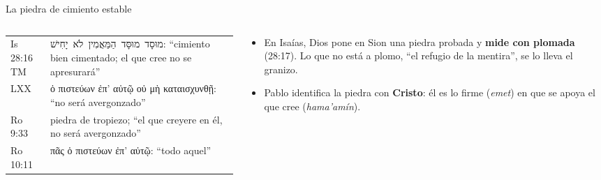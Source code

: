 \documentclass[hyperref={bookmarks=false},aspectratio=169]{beamer}
\newcommand{\heb}[1]{\mbox{\foreignlanguage{hebrew}{#1}}}
\newcommand{\grc}[1]{\foreignlanguage{ancientgreek}{#1}}
\newcommand{\destacar}[1]{\textbf{\textcolor{azul}{#1}}}
\begin{document}
\begin{frame}{La piedra de cimiento estable}
\begin{columns}[t,onlytextwidth]
\begin{column}{0.50\textwidth}
\scriptsize\renewcommand{\arraystretch}{1.18}
\begin{tabular}{@{}>{\RaggedRight\arraybackslash}p{1.2cm}>{\RaggedRight\arraybackslash}p{4.8cm}@{}}
\toprule
Is 28:16 TM & \heb{מוּסָד מוּסָּד הַמַּאֲמִין לֹא יָחִישׁ}: ``cimiento bien cimentado; el que cree no se apresurará'' \\
LXX & \grc{ὁ πιστεύων ἐπ' αὐτῷ οὐ μὴ καταισχυνθῇ}: ``no será avergonzado'' \\
Ro 9:33 & piedra de tropiezo; ``el que creyere en él, no será avergonzado'' \\
Ro 10:11 & \grc{πᾶς ὁ πιστεύων ἐπ' αὐτῷ}: ``todo aquel'' \\
\bottomrule
\end{tabular}
\end{column}
\begin{column}{0.48\textwidth}\small
\begin{itemize}
\item En Isaías, Dios pone en Sion una piedra probada y \destacar{mide con plomada} (28:17). Lo que no está a plomo, ``el refugio de la mentira'', se lo lleva el granizo.
\item Pablo identifica la piedra con \destacar{Cristo}: él es lo firme (\emph{emet}) en que se apoya el que cree (\emph{hama'amín}).
\end{itemize}
\end{column}
\end{columns}\par\medskip
\centering
{}
\end{frame}
\end{document}
